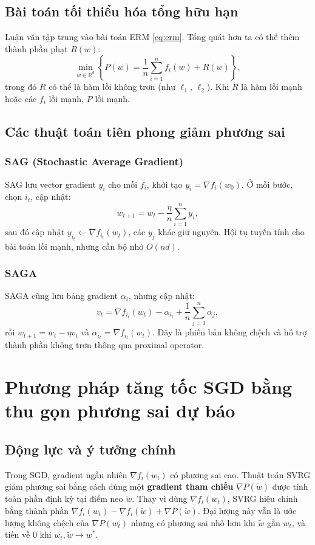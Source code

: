 \documentclass[12pt,a4paper]{report}
\theoremstyle{definition}
\begin{document}
\section{Bài toán tối thiểu hóa tổng hữu hạn}
Luận văn tập trung vào bài toán ERM \eqref{eq:erm}. Tổng quát hơn ta có thể thêm thành phần phạt $R(w)$:
\begin{equation}
\min_{w\in\mathbb{R}^d} \left\{ P(w) = \frac{1}{n}\sum_{i=1}^{n} f_i(w) + R(w) \right\},
\end{equation}
trong đó $R$ có thể là hàm lồi không trơn (như $\ell_1$, $\ell_2$). Khi $R$ là hàm lồi mạnh hoặc các $f_i$ lồi mạnh, $P$ lồi mạnh.

\section{Các thuật toán tiên phong giảm phương sai}
\subsection{SAG (Stochastic Average Gradient)}
SAG \citep{leroux2012stochastic} lưu vector gradient $y_i$ cho mỗi $f_i$, khởi tạo $y_i = \nabla f_i(w_0)$. Ở mỗi bước, chọn $i_t$, cập nhật:
\begin{equation}
w_{t+1} = w_t - \frac{\eta}{n} \sum_{i=1}^{n} y_i,
\end{equation}
sau đó cập nhật $y_{i_t} \leftarrow \nabla f_{i_t}(w_t)$, các $y_j$ khác giữ nguyên. Hội tụ tuyến tính cho bài toán lồi mạnh, nhưng cần bộ nhớ $O(nd)$.

\subsection{SAGA}
SAGA \citep{defazio2014saga} cũng lưu bảng gradient $\alpha_i$, nhưng cập nhật:
\begin{equation}
v_t = \nabla f_{i_t}(w_t) - \alpha_{i_t} + \frac{1}{n}\sum_{j=1}^{n}\alpha_j,
\end{equation}
rồi $w_{t+1}=w_t - \eta v_t$ và $\alpha_{i_t} = \nabla f_{i_t}(w_t)$. Đây là phiên bản không chệch và hỗ trợ thành phần không trơn thông qua proximal operator.

\chapter{Phương pháp tăng tốc SGD bằng thu gọn phương sai dự báo}

\section{Động lực và ý tưởng chính}
Trong SGD, gradient ngẫu nhiên $\nabla f_i(w_t)$ có phương sai cao. Thuật toán SVRG giảm phương sai bằng cách dùng một \textbf{gradient tham chiếu} $\nabla P(\tilde{w})$ được tính toàn phần định kỳ tại điểm neo $\tilde{w}$. Thay vì dùng $\nabla f_i(w_t)$, SVRG hiệu chỉnh bằng thành phần $\nabla f_i(w_t) - \nabla f_i(\tilde{w}) + \nabla P(\tilde{w})$. Đại lượng này vẫn là ước lượng không chệch của $\nabla P(w_t)$ nhưng có phương sai nhỏ hơn khi $\tilde{w}$ gần $w_t$, và tiến về 0 khi $w_t,\tilde{w}\to w^*$.
\end{document}
